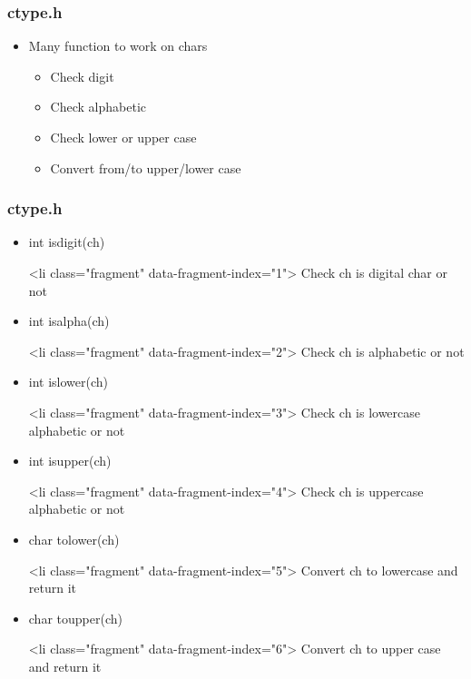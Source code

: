 \documentclass{../c-lecture}
\begin{document}
\begin{frame}
  \frametitle{ctype.h}
  \begin{itemize}
    \item Many function to work on chars
    \begin{itemize}
      \item Check digit
      \item Check alphabetic
      \item Check lower or upper case
      \item Convert from/to upper/lower case
    \end{itemize}
  \end{itemize}
\end{frame}
\begin{frame}
  \frametitle{ctype.h}
  \begin{itemize}
    \item int isdigit(ch)
    \begin{itemize}
      <li class="fragment" data-fragment-index="1">
        Check ch is digital char or not

    \end{itemize}
    \item int isalpha(ch)
    \begin{itemize}
      <li class="fragment" data-fragment-index="2">
        Check ch is alphabetic or not

    \end{itemize}
    \item int islower(ch)
    \begin{itemize}
      <li class="fragment" data-fragment-index="3">
        Check ch is lowercase alphabetic or not

    \end{itemize}
    \item int isupper(ch)
    \begin{itemize}
      <li class="fragment" data-fragment-index="4">
        Check ch is uppercase alphabetic or not

    \end{itemize}
    \item char tolower(ch)
    \begin{itemize}
      <li class="fragment" data-fragment-index="5">
        Convert ch to lowercase and return it

    \end{itemize}
    \item char toupper(ch)
    \begin{itemize}
      <li class="fragment" data-fragment-index="6">
        Convert ch to upper case and return it

    \end{itemize}
  \end{itemize}
\end{frame}
\end{document}
